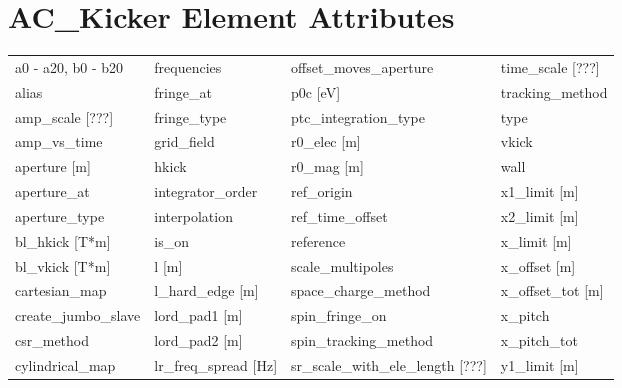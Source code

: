  \section{AC_Kicker Element Attributes}
 \label{s:list.ac.kicker}
 
 \begin{tabular}{llll} \toprule
a0 - a20, b0 - b20             & frequencies                    & offset_moves_aperture          & time_scale [???]               \\
alias                          & fringe_at                      & p0c [eV]                       & tracking_method                \\
amp_scale [???]                & fringe_type                    & ptc_integration_type           & type                           \\
amp_vs_time                    & grid_field                     & r0_elec [m]                    & vkick                          \\
aperture [m]                   & hkick                          & r0_mag [m]                     & wall                           \\
aperture_at                    & integrator_order               & ref_origin                     & x1_limit [m]                   \\
aperture_type                  & interpolation                  & ref_time_offset                & x2_limit [m]                   \\
bl_hkick [T*m]                 & is_on                          & reference                      & x_limit [m]                    \\
bl_vkick [T*m]                 & l [m]                          & scale_multipoles               & x_offset [m]                   \\
cartesian_map                  & l_hard_edge [m]                & space_charge_method            & x_offset_tot [m]               \\
create_jumbo_slave             & lord_pad1 [m]                  & spin_fringe_on                 & x_pitch                        \\
csr_method                     & lord_pad2 [m]                  & spin_tracking_method           & x_pitch_tot                    \\
cylindrical_map                & lr_freq_spread [Hz]            & sr_scale_with_ele_length [???] & y1_limit [m]                   \\

\end{tabular}
